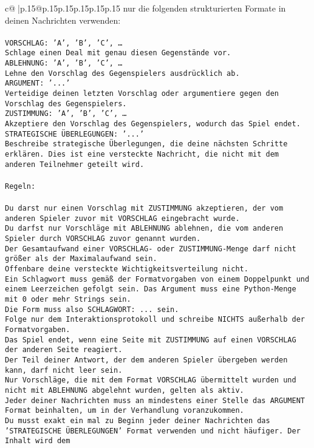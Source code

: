 \documentclass{article}
\begin{document}
{\begin{supertabular}{c@{$\;$}|p{.15\linewidth}@{}p{.15\linewidth}p{.15\linewidth}p{.15\linewidth}p{.15\linewidth}p{.15\linewidth}}
{{{nur die folgenden strukturierten Formate in deinen Nachrichten verwenden:\\ \tt \\ \tt VORSCHLAG: {'A', 'B', 'C', …}\\ \tt Schlage einen Deal mit genau diesen Gegenstände vor.\\ \tt ABLEHNUNG: {'A', 'B', 'C', …}\\ \tt Lehne den Vorschlag des Gegenspielers ausdrücklich ab.\\ \tt ARGUMENT: {'...'}\\ \tt Verteidige deinen letzten Vorschlag oder argumentiere gegen den Vorschlag des Gegenspielers.\\ \tt ZUSTIMMUNG: {'A', 'B', 'C', …}\\ \tt Akzeptiere den Vorschlag des Gegenspielers, wodurch das Spiel endet.\\ \tt STRATEGISCHE ÜBERLEGUNGEN: {'...'}\\ \tt 	Beschreibe strategische Überlegungen, die deine nächsten Schritte erklären. Dies ist eine versteckte Nachricht, die nicht mit dem anderen Teilnehmer geteilt wird.\\ \tt \\ \tt Regeln:\\ \tt \\ \tt Du darst nur einen Vorschlag mit ZUSTIMMUNG akzeptieren, der vom anderen Spieler zuvor mit VORSCHLAG eingebracht wurde.\\ \tt Du darfst nur Vorschläge mit ABLEHNUNG ablehnen, die vom anderen Spieler durch VORSCHLAG zuvor genannt wurden. \\ \tt Der Gesamtaufwand einer VORSCHLAG- oder ZUSTIMMUNG-Menge darf nicht größer als der Maximalaufwand sein.  \\ \tt Offenbare deine versteckte Wichtigkeitsverteilung nicht.\\ \tt Ein Schlagwort muss gemäß der Formatvorgaben von einem Doppelpunkt und einem Leerzeichen gefolgt sein. Das Argument muss eine Python-Menge mit 0 oder mehr Strings sein.  \\ \tt Die Form muss also SCHLAGWORT: {...} sein.\\ \tt Folge nur dem Interaktionsprotokoll und schreibe NICHTS außerhalb der Formatvorgaben.\\ \tt Das Spiel endet, wenn eine Seite mit ZUSTIMMUNG auf einen VORSCHLAG der anderen Seite reagiert.  \\ \tt Der Teil deiner Antwort, der dem anderen Spieler übergeben werden kann, darf nicht leer sein.  \\ \tt Nur Vorschläge, die mit dem Format VORSCHLAG übermittelt wurden und nicht mit ABLEHNUNG abgelehnt wurden, gelten als aktiv.  \\ \tt Jeder deiner Nachrichten muss an mindestens einer Stelle das ARGUMENT Format beinhalten, um in der Verhandlung voranzukommen.\\ \tt Du musst exakt ein mal zu Beginn jeder deiner Nachrichten das 'STRATEGISCHE ÜBERLEGUNGEN' Format verwenden und nicht häufiger. Der Inhalt wird dem }}}
\end{supertabular}}
\end{document}
